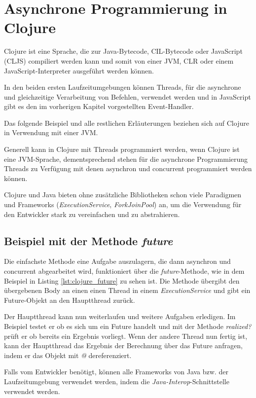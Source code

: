 \section{Asynchrone Programmierung in Clojure}

Clojure ist eine Sprache, die zur Java-Bytecode, CIL-Bytecode oder JavaScript (\acl{CLJS}) compiliert werden kann und somit von einer \ac{JVM}, \ac{CLR} oder einem JavaScript-Interpreter ausgeführt werden können.

In den beiden ersten Laufzeitumgebungen können Threads, für die asynchrone und gleichzeitige Verarbeitung von Befehlen, verwendet werden und in JavaScript gibt es den im vorherigen Kapitel vorgestellten Event-Handler.

Das folgende Beispiel und alle restlichen Erläuterungen beziehen sich auf Clojure in Verwendung mit einer \ac{JVM}.

Generell kann in Clojure mit Threads programmiert werden, wenn
Clojure ist eine \ac{JVM}-Sprache, dementsprechend stehen für die asynchrone Programmierung  Threads zu Verfügung mit denen asynchron und concurrent programmiert werden können.

Clojure und Java bieten ohne zusätzliche Bibliotheken schon viele Paradigmen und Frameworks (\textit{ExecutionService}, \textit{ForkJoinPool}) an, um die Verwendung für den Entwickler stark zu vereinfachen und zu abstrahieren.

\subsection*{Beispiel mit der Methode \textit{future}}
Die einfachste Methode eine Aufgabe auszulagern, die dann asynchron und concurrent abgearbeitet wird, funktioniert über die \textit{future}-Methode, wie in dem Beispiel in Listing \ref{lst:clojure_future} zu sehen ist. Die Methode übergibt den übergebenen Body an einen einen Thread in einem \textit{ExecutionService} und gibt ein Future-Objekt an den Hauptthread zurück.

Der Hauptthread kann nun weiterlaufen und weitere Aufgaben erledigen. Im Beispiel testet er ob es sich um ein Future handelt und mit der Methode \textit{realized?} prüft er ob bereits ein Ergebnis vorliegt. Wenn der andere Thread nun fertig ist, kann der Hauptthread das Ergebnis der Berechnung über das Future anfragen, indem er das Objekt mit \textit{@} dereferenziert.

Falls vom Entwickler benötigt, können alle Frameworks von Java bzw. der Laufzeitumgebung verwendet werden, indem die \textit{Java-Interop}-Schnittstelle verwendet werden. 

